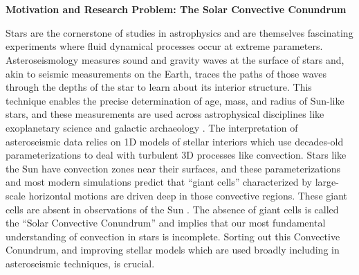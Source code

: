\documentclass[onecolumn, 11pt, hmargin=1in, vmargin=1in]{aastex62}
\begin{document}
\section*{}
\thispagestyle{fancy}

\begin{center}
\vspace{-1.45in}
\textbf{Motivation and Research Problem: The Solar Convective Conundrum}
\vspace{-11pt}
\end{center}

Stars are the cornerstone of studies in astrophysics and are themselves fascinating experiments where fluid dynamical processes occur at extreme parameters.
Asteroseismology measures sound and gravity waves at the surface of stars and, akin to seismic measurements on the Earth, traces the paths of those waves through the depths of the star to learn about its interior structure.
This technique enables the precise determination of age, mass, and radius of Sun-like stars, and these measurements are used across astrophysical disciplines like exoplanetary science and galactic archaeology \citep{huber&all2019}.
The interpretation of asteroseismic data relies on 1D models of stellar interiors which use decades-old parameterizations \citep{bohm-vitense1958} to deal with turbulent 3D processes like convection.
Stars like the Sun have convection zones near their surfaces, and these parameterizations and most modern simulations predict that ``giant cells'' characterized by large-scale horizontal motions are driven deep in those convective regions.
These giant cells are absent in observations of the Sun \citep{hanasoge&all2015}.
The absence of giant cells is called the ``Solar Convective Conundrum'' and implies that our most fundamental understanding of convection in stars is incomplete.
Sorting out this Convective Conundrum, and improving stellar models which are used broadly including in asteroseismic techniques, is crucial.
\end{document}
